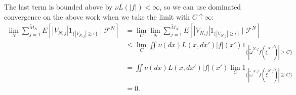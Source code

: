 \documentclass{article}
\begin{document}
The last term is bounded above by $\nu L(|f|) <\infty$, so we can use dominated convergence on the above work when we take the limit with $C \uparrow \infty$:
\begin{align*}
\lim_N \sum_{j=1}^{\tilde{M}_N} E\left[ |V_{N,j}| 1_{\{|V_{N,j}| \ge \epsilon \} } \mid \mathcal{F}^N\right] &=
\lim_C \lim_N \sum_{j=1}^{\tilde{M}_N} E\left[ |V_{N,j}| 1_{\{|V_{N,j}| \ge \epsilon \} } \mid \mathcal{F}^N\right] \\ 
&\le \lim_C \iint \nu(dx) L(x, d x') |f|(x') 1_{\{| \tilde{\omega}^{N,j} f(\tilde{\xi}^{N,j})| \ge C \} }  \tag{above} \\
&=  \iint \nu(dx) L(x, d x') |f|(x') \lim_C 1_{\{| \tilde{\omega}^{N,j} f(\tilde{\xi}^{N,j})| \ge C \} }  \tag{DCT}\\
&=  0.
\end{align*}
\end{document}

